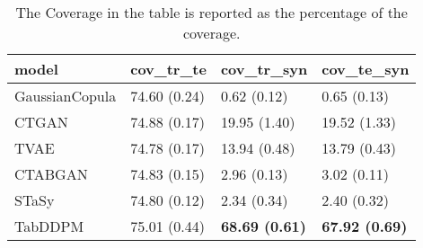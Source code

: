 \begin{table}[h!t]
\vspace{-5mm}
\caption{The Coverage in the table is reported as the percentage of the coverage.}
\label{tab:diversity}
\begin{adjustbox}{width=0.6\textwidth, center} 

\begin{tabular}{|l|l|l|l|}
\hline
model          & cov\_tr\_te  & cov\_tr\_syn          & cov\_te\_syn          \\ \hline
GaussianCopula & 74.60 (0.24) & 0.62 (0.12)           & 0.65 (0.13)           \\ \hline
CTGAN          & 74.88 (0.17) & 19.95 (1.40)          & 19.52 (1.33)          \\ \hline
TVAE           & 74.78 (0.17) & 13.94 (0.48)          & 13.79 (0.43)          \\ \hline
CTABGAN        & 74.83 (0.15) & 2.96 (0.13)           & 3.02 (0.11)           \\ \hline
STaSy          & 74.80 (0.12) & 2.34 (0.34)           & 2.40 (0.32)           \\ \hline
TabDDPM        & 75.01 (0.44) & \textbf{68.69 (0.61)} & \textbf{67.92 (0.69)} \\ \hline
\end{tabular}

\end{adjustbox}
\vspace{-5mm}
\end{table}
